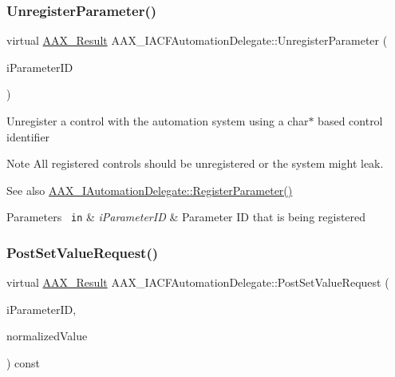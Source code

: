 \subsubsection{\texorpdfstring{UnregisterParameter()}{UnregisterParameter()}}
{\footnotesize\ttfamily virtual \mbox{\hyperlink{a00392_a4d8f69a697df7f70c3a8e9b8ee130d2f}{A\+A\+X\+\_\+\+Result}} A\+A\+X\+\_\+\+I\+A\+C\+F\+Automation\+Delegate\+::\+Unregister\+Parameter (\begin{DoxyParamCaption}\item[{\mbox{\hyperlink{a00392_a1440c756fe5cb158b78193b2fc1780d1}{A\+A\+X\+\_\+\+C\+Param\+ID}}}]{i\+Parameter\+ID }\end{DoxyParamCaption})\hspace{0.3cm}{\ttfamily [pure virtual]}}





Unregister a control with the automation system using a char$\ast$ based control identifier

\begin{DoxyNote}{Note}
All registered controls should be unregistered or the system might leak.
\end{DoxyNote}
\begin{DoxySeeAlso}{See also}
\mbox{\hyperlink{a01773_a4d91efb2d922729d02e2ea7d7a05ed10}{A\+A\+X\+\_\+\+I\+Automation\+Delegate\+::\+Register\+Parameter()}}
\end{DoxySeeAlso}

\begin{DoxyParams}[1]{Parameters}
\mbox{\texttt{ in}}  & {\em i\+Parameter\+ID} & Parameter ID that is being registered \\
\hline
\end{DoxyParams}
\mbox{\label{a01617_a094075c1a3ddaf01a29a024ce03aabc0}} 
\subsubsection{\texorpdfstring{PostSetValueRequest()}{PostSetValueRequest()}}
{\footnotesize\ttfamily virtual \mbox{\hyperlink{a00392_a4d8f69a697df7f70c3a8e9b8ee130d2f}{A\+A\+X\+\_\+\+Result}} A\+A\+X\+\_\+\+I\+A\+C\+F\+Automation\+Delegate\+::\+Post\+Set\+Value\+Request (\begin{DoxyParamCaption}\item[{\mbox{\hyperlink{a00392_a1440c756fe5cb158b78193b2fc1780d1}{A\+A\+X\+\_\+\+C\+Param\+ID}}}]{i\+Parameter\+ID,  }\item[{double}]{normalized\+Value }\end{DoxyParamCaption}) const\hspace{0.3cm}{\ttfamily [pure virtual]}}





